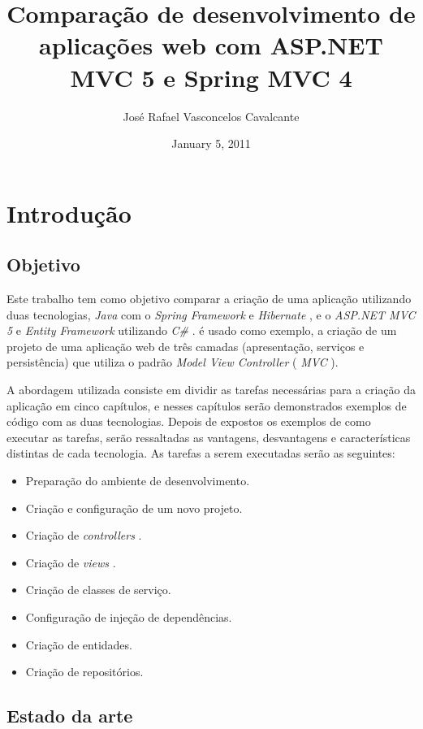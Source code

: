 \documentclass[a4paper,12pt]{article}
\newcommand{\est}[1] {
	\textit{#1}
}
\newcommand{\sigla}[1] {
	\textit{#1}
}
\newcommand{\lang}[1] {
	\textit{#1}
}
\newcommand{\lib}[1] {
	\textit{#1}
}
\begin{document}
\title{Comparação de desenvolvimento de aplicações web com ASP.NET MVC 5 e Spring MVC 4}
\author{José Rafael Vasconcelos Cavalcante}
\date{January 5, 2011}
\maketitle

\newpage
\section{Introdução}

\subsection{Objetivo}

Este trabalho tem como objetivo comparar a criação de uma aplicação utilizando duas tecnologias, \lang{Java} com o \lib{Spring Framework} e \lib{Hibernate}, e o \sigla{ASP.NET MVC 5} e \lib{Entity Framework} utilizando \lang{C\#}. é usado como exemplo, a criação de um projeto de uma aplicação web de três camadas (apresentação, serviços e persistência) que utiliza o padrão \est{Model View Controller} (\sigla{MVC}).

A abordagem utilizada consiste em dividir as tarefas necessárias para a criação da aplicação em cinco capítulos, e nesses capítulos serão demonstrados exemplos de código com as duas tecnologias. Depois de expostos os exemplos de como executar as tarefas, serão ressaltadas as vantagens, desvantagens e características distintas de cada tecnologia. As tarefas a serem executadas serão as seguintes:

\begin{itemize}
  \item Preparação do ambiente de desenvolvimento.
  \item Criação e configuração de um novo projeto.
  \item Criação de \est{controllers}.
  \item Criação de \est{views}.
  \item Criação de classes de serviço.
  \item Configuração de injeção de dependências.
  \item Criação de entidades.
  \item Criação de repositórios.
\end{itemize}

\subsection{Estado da arte}
 
\end{document}
